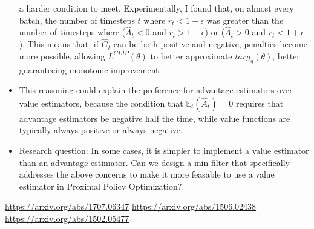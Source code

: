 \documentclass[a4paper]{article}
\begin{document}
\begin{itemize}
        a harder condition to meet. Experimentally, I found that, on almost
        every batch, the number of timesteps $t$ where
        $r_t < 1 + \epsilon$ was greater than the number of timesteps where
        ($\hat{A}_t < 0$ and $r_t > 1 - \epsilon$) or ($\hat{A}_t > 0$ and 
        $r_t < 1 + \epsilon$). This means that, if $\hat{G}_t$ can be
        both positive and negative, penalties become more possible, allowing
        $L^{CLIP}(\theta)$ to better approximate $targ_{g}(\theta)$, better
        guaranteeing monotonic improvement.
    \item This reasoning could explain the preference for
        advantage estimators over value estimators, because the condition that 
        $\mathbb{E}_t(\hat{A}_t) = 0$ requires that advantage estimators be
        negative half the time, while value functions are typically always
        positive or always negative.
    \item Research question: In some cases, it is simpler to implement a value
        estimator than an advantage estimator. Can we design a min-filter that
        specifically addresses the above concerns to make it more feasable to
        use a value estimator in Proximal Policy Optimization?
        
\end{itemize}

%

\newpage
\begin{thebibliography}{9}
\url{https://arxiv.org/abs/1707.06347}
\url{https://arxiv.org/abs/1506.02438}
\url{https://arxiv.org/abs/1502.05477}
\end{thebibliography}
\end{document}
